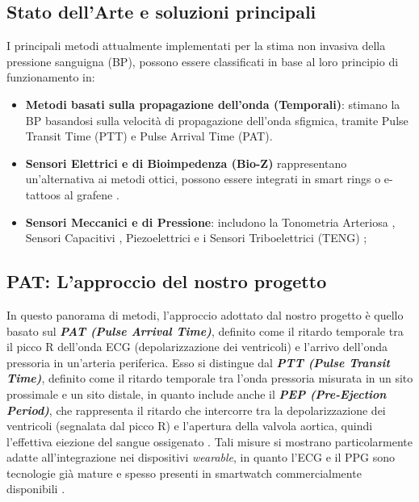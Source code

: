 \documentclass[11pt,a4paper]{article}
\begin{document}
\subsection{Stato dell'Arte e soluzioni principali}
I principali metodi attualmente implementati per la stima non invasiva della pressione sanguigna (BP), possono essere classificati in base al loro principio di funzionamento in:
\begin{itemize}
    \item \textbf{Metodi basati sulla propagazione dell'onda (Temporali)}: stimano la BP basandosi sulla velocità di propagazione dell'onda sfigmica, tramite Pulse Transit Time (PTT) e Pulse Arrival Time (PAT)\cite{Finnegan2021}\cite{Xie_Effects}.
    \item \textbf{Sensori Elettrici e di Bioimpedenza (Bio-Z)} \cite{Ibrahim2019} rappresentano un'alternativa ai metodi ottici, possono essere integrati in smart rings \cite{Sel2023} o e-tattoos al grafene \cite{Hua2024}.
    \item \textbf{Sensori Meccanici e di Pressione}: includono la Tonometria Arteriosa \cite{Sato1993}, Sensori Capacitivi \cite{Bijender2021}, Piezoelettrici \cite{Yi2022}  e i Sensori Triboelettrici (TENG) \cite{Wang2024};
\end{itemize}

\subsection{PAT: L'approccio del nostro progetto}
In questo panorama di metodi, l’approccio adottato dal nostro progetto è quello basato sul \textbf{\textit{PAT (Pulse Arrival Time)}}, definito come il ritardo temporale tra il picco R dell'onda ECG (depolarizzazione dei ventricoli) e l'arrivo dell'onda pressoria in un'arteria periferica\cite{Panula2023}. Esso si distingue dal \textbf\textit{{PTT (Pulse Transit Time)}}, definito come il ritardo temporale tra l’onda pressoria misurata in un sito prossimale e un sito distale, in quanto include anche il \textbf{\textit{PEP (Pre-Ejection Period)}}, che rappresenta il ritardo che intercorre tra la depolarizzazione dei ventricoli (segnalata dal picco R) e l'apertura della valvola aortica, quindi l’effettiva eiezione del sangue ossigenato \cite{Loureiro2023}.
Tali misure si mostrano particolarmente adatte all’integrazione nei dispositivi \textit{wearable}, in quanto l’ECG e il PPG sono tecnologie già mature e spesso presenti in smartwatch commercialmente disponibili \cite{Zhou2023}. 
\end{document}
